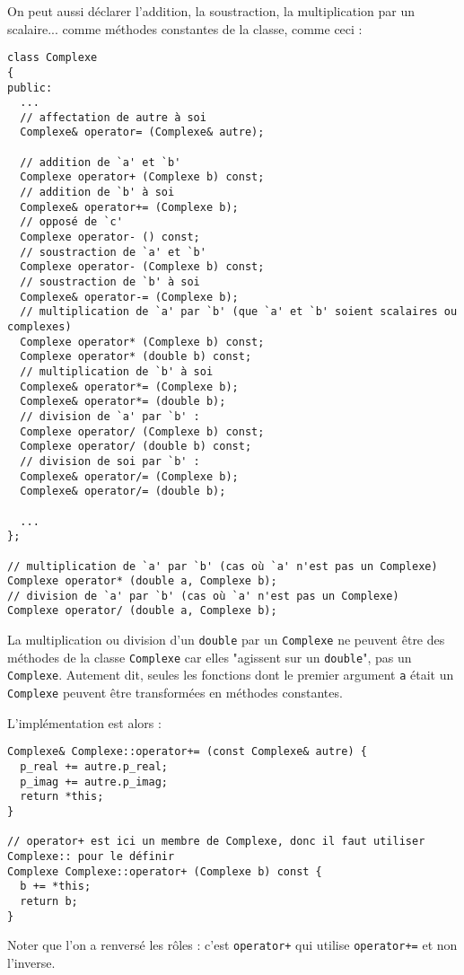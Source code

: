 \documentclass{book}
\newcommand{\inline}[1]{\texttt{#1}}
\begin{document}
\begin{correction}
On peut aussi déclarer l'addition, la soustraction, la multiplication par un scalaire... comme méthodes constantes de la classe, comme ceci :

\begin{verbatim}
class Complexe
{
public:
  ...
  // affectation de autre à soi
  Complexe& operator= (Complexe& autre);
  
  // addition de `a' et `b'
  Complexe operator+ (Complexe b) const;
  // addition de `b' à soi
  Complexe& operator+= (Complexe b);
  // opposé de `c'
  Complexe operator- () const;
  // soustraction de `a' et `b'
  Complexe operator- (Complexe b) const;
  // soustraction de `b' à soi
  Complexe& operator-= (Complexe b);
  // multiplication de `a' par `b' (que `a' et `b' soient scalaires ou complexes)
  Complexe operator* (Complexe b) const;
  Complexe operator* (double b) const;
  // multiplication de `b' à soi
  Complexe& operator*= (Complexe b);
  Complexe& operator*= (double b);
  // division de `a' par `b' :
  Complexe operator/ (Complexe b) const;
  Complexe operator/ (double b) const;
  // division de soi par `b' :
  Complexe& operator/= (Complexe b);
  Complexe& operator/= (double b);

  ...
};

// multiplication de `a' par `b' (cas où `a' n'est pas un Complexe)
Complexe operator* (double a, Complexe b);
// division de `a' par `b' (cas où `a' n'est pas un Complexe)
Complexe operator/ (double a, Complexe b);
\end{verbatim}

La multiplication ou division d'un \inline{double} par un \inline{Complexe} ne peuvent être des méthodes de la classe \inline{Complexe} car elles "agissent sur un \inline{double}", pas un \inline{Complexe}. Autement dit, seules les fonctions dont le premier argument \texttt{a} était un \inline{Complexe} peuvent être transformées en méthodes constantes.

L'implémentation est alors :
\begin{verbatim}
Complexe& Complexe::operator+= (const Complexe& autre) {
  p_real += autre.p_real;
  p_imag += autre.p_imag;
  return *this;
}

// operator+ est ici un membre de Complexe, donc il faut utiliser Complexe:: pour le définir
Complexe Complexe::operator+ (Complexe b) const {
  b += *this;
  return b;
}
\end{verbatim}

Noter que l'on a renversé les rôles : c'est \inline{operator+} qui utilise \inline{operator+=} et non l'inverse. 

\end{correction}
\end{document}
